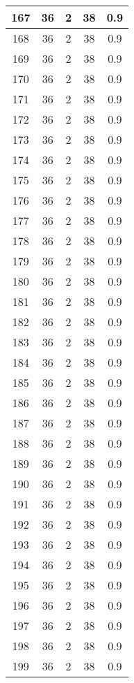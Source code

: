 \documentclass[letterpaper, 12pt]{article}
\begin{document}
\begin{longtable}{|c|c|c|c|c|}
\hline
167 & 36 & 2 & 38 & 0.9 \\
\hline
168 & 36 & 2 & 38 & 0.9 \\
\hline
169 & 36 & 2 & 38 & 0.9 \\
\hline
170 & 36 & 2 & 38 & 0.9 \\
\hline
171 & 36 & 2 & 38 & 0.9 \\
\hline
172 & 36 & 2 & 38 & 0.9 \\
\hline
173 & 36 & 2 & 38 & 0.9 \\
\hline
174 & 36 & 2 & 38 & 0.9 \\
\hline
175 & 36 & 2 & 38 & 0.9 \\
\hline
176 & 36 & 2 & 38 & 0.9 \\
\hline
177 & 36 & 2 & 38 & 0.9 \\
\hline
178 & 36 & 2 & 38 & 0.9 \\
\hline
179 & 36 & 2 & 38 & 0.9 \\
\hline
180 & 36 & 2 & 38 & 0.9 \\
\hline
181 & 36 & 2 & 38 & 0.9 \\
\hline
182 & 36 & 2 & 38 & 0.9 \\
\hline
183 & 36 & 2 & 38 & 0.9 \\
\hline
184 & 36 & 2 & 38 & 0.9 \\
\hline
185 & 36 & 2 & 38 & 0.9 \\
\hline
186 & 36 & 2 & 38 & 0.9 \\
\hline
187 & 36 & 2 & 38 & 0.9 \\
\hline
188 & 36 & 2 & 38 & 0.9 \\
\hline
189 & 36 & 2 & 38 & 0.9 \\
\hline
190 & 36 & 2 & 38 & 0.9 \\
\hline
191 & 36 & 2 & 38 & 0.9 \\
\hline
192 & 36 & 2 & 38 & 0.9 \\
\hline
193 & 36 & 2 & 38 & 0.9 \\
\hline
194 & 36 & 2 & 38 & 0.9 \\
\hline
195 & 36 & 2 & 38 & 0.9 \\
\hline
196 & 36 & 2 & 38 & 0.9 \\
\hline
197 & 36 & 2 & 38 & 0.9 \\
\hline
198 & 36 & 2 & 38 & 0.9 \\
\hline
199 & 36 & 2 & 38 & 0.9 \\
\hline
\end{longtable}
\end{document}
